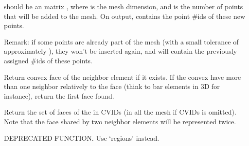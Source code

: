 \documentclass[a4paper,11pt,english]{sphinxmanual}
\begin{document}
\begin{fulllineitems}
\begin{fulllineitems}
 should be an  matrix , where  is the mesh
dimension, and  is the number of points that will be
added to the mesh. On output,  contains the point \#ids
of these new points.

Remark: if some points are already part of the mesh (with a small
tolerance of approximately ), they won’t be inserted again,
and  will contain the previously assigned \#ids of these
points.

\end{fulllineitems}


\begin{fulllineitems}
\label{\detokenize{python/cmdref_Mesh:getfem.Mesh.adjacent_face}}
Return convex face of the neighbor element if it exists.
If the convex have more than one neighbor
relatively to the face  (think to bar elements in 3D for instance),
return the first face found.

\end{fulllineitems}


\begin{fulllineitems}
\label{\detokenize{python/cmdref_Mesh:getfem.Mesh.all_faces}}
Return the set of faces of the in CVIDs (in all the mesh if CVIDs is
omitted). Note that the face shared by two neighbor elements will be
represented twice.

\end{fulllineitems}


\begin{fulllineitems}
\label{\detokenize{python/cmdref_Mesh:getfem.Mesh.boundaries}}
DEPRECATED FUNCTION. Use ‘regions’ instead.


\end{fulllineitems}
\end{fulllineitems}
\end{document}
